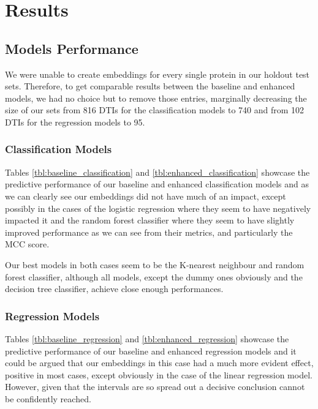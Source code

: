 \section{Results}

\subsection{Models Performance}

We were unable to create embeddings for every single protein in our holdout test sets. Therefore, to get comparable results between the baseline and enhanced models, we had no choice but to remove those entries, marginally decreasing the size of our sets from 816 DTIs for the classification models to 740 and from 102 DTIs for the regression models to 95.

\subsubsection{Classification Models}

Tables \ref{tbl:baseline_classification} and \ref{tbl:enhanced_classification} showcase the predictive performance of our baseline and enhanced classification models and as we can clearly see our embeddings did not have much of an impact, except possibly in the cases of the logistic regression where they seem to have negatively impacted it and the random forest classifier where they seem to have slightly improved performance as we can see from their metrics, and particularly the MCC score.

Our best models in both cases seem to be the K-nearest neighbour and random forest classifier, although all models, except the dummy ones obviously and the decision tree classifier, achieve close enough performances.

\subsubsection{Regression Models}
\label{subsubsec:Regression_Performance}

Tables \ref{tbl:baseline_regression} and \ref{tbl:enhanced_regression} showcase the predictive performance of our baseline and enhanced regression models and it could be argued that our embeddings in this case had a much more evident effect, positive in most cases, except obviously in the case of the linear regression model. However, given that the intervals are so spread out a decisive conclusion cannot be confidently reached.

